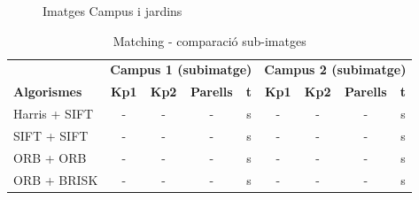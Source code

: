 		\begin{figure}[!htb]
			\caption{Imatges Campus i jardins}
		\end{figure}

		\begin{table}[H]
			\begin{center}
				\begin{tabular}{l | c c c c | c c c c}
					& \multicolumn{4}{c|}{\textbf{Campus 1 (subimatge)}} & \multicolumn{4}{c}{\textbf{Campus 2 (subimatge)}} \\
					\textbf{Algorismes} & \textbf{Kp1} & \textbf{Kp2} & \textbf{Parells} & \textbf{t} & \textbf{Kp1} & \textbf{Kp2} & \textbf{Parells} & \textbf{t} \\ \hline
					Harris + SIFT & - & - & - & s & - & - & - & s \\
					SIFT + SIFT & - & - & - & s & - & - & - & s \\
					ORB + ORB & - & - & - & s & - & - & - & s \\
					ORB + BRISK & - & - & - & s & - & - & - & s \\
				\end{tabular}
			\end{center}
			\caption{Matching - comparació sub-imatges}
		\end{table}

